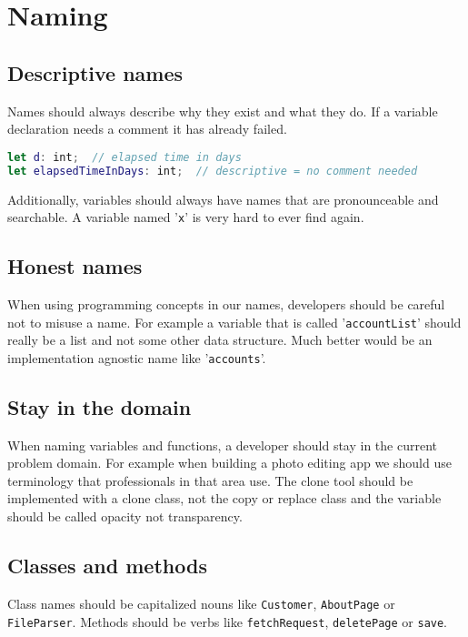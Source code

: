 \section{Naming}

\subsection{Descriptive names}
Names should always describe why they exist and what they do. If a variable declaration needs a comment it has already failed.

\begin{lstlisting}[language=Swift]
let d: int;  // elapsed time in days
let elapsedTimeInDays: int;  // descriptive = no comment needed
\end{lstlisting}
\raggedright

Additionally, variables should always have names that are pronounceable and searchable. A variable named '\texttt{x}' is very hard to ever find again.

\subsection{Honest names}
When using programming concepts in our names, developers should be careful not to misuse a name. For example a variable that is called '\texttt{accountList}' should really be a list and not some other data structure. Much better would be an implementation agnostic name like '\texttt{accounts}'.

\subsection{Stay in the domain}
When naming variables and functions, a developer should stay in the current problem domain. For example when building a photo editing app we should use terminology that professionals in that area use. The clone tool should be implemented with a clone class, not the copy or replace class and the variable should be called opacity not transparency.

\subsection{Classes and methods}
Class names should be capitalized nouns like \texttt{Customer}, \texttt{AboutPage} or \texttt{FileParser}. Methods should be verbs like \texttt{fetchRequest}, \texttt{deletePage} or \texttt{save}.

